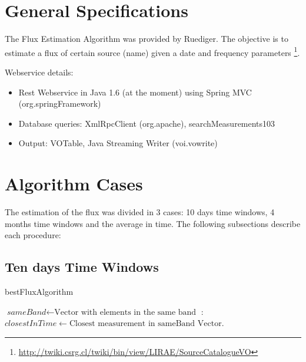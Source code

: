 \documentclass[10pt]{article}
\title{
\center{\emph{Flux Estimation Algorithm} \\}
\author{
        Ruediger Kneissl, Jonathan Antognini\\
}}
\begin{document}
\maketitle

\section{General Specifications}

The Flux Estimation Algorithm was provided by Ruediger. The objective is to estimate
a flux of certain source (name) given a date and frequency parameters
\footnote{\url{http://twiki.csrg.cl/twiki/bin/view/LIRAE/SourceCatalogueVO}}.

Webservice details:
\begin{itemize}
 \item Rest Webservice in Java 1.6 (at the moment) using Spring MVC (org.springFramework)
 \item Database queries: XmlRpcClient (org.apache), searchMeasurements103
 \item Output: VOTable, Java Streaming Writer (voi.vowrite)
\end{itemize}

\section{Algorithm Cases}

The estimation of the flux was divided in 3 cases: 10 days time windows, 4
months time windows and the average in time. The following subsections describe
each procedure:

\subsection{Ten days Time Windows}
\begin{algorithm}
\caption{bestFluxAlgorithm}\label{10days}
\begin{algorithmic}[1]
\State $\textit{sameBand} \gets \text{Vector with elements in the same band}$
: 
\State $closestInTime \gets \text{Closest measurement in sameBand Vector}$.
\Statex
\State {}
\Else
\State {}
\EndIf
\EndProcedure
\end{algorithmic}
\end{algorithm}
\end{document}
